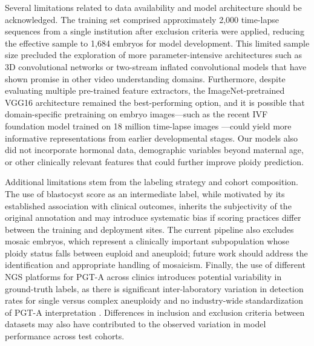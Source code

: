 \documentclass[11pt]{article}
\begin{document}
Several limitations related to data availability and model architecture should be acknowledged. The training set comprised approximately 2{,}000 time-lapse sequences from a single institution after exclusion criteria were applied, reducing the effective sample to 1{,}684 embryos for model development. This limited sample size precluded the exploration of more parameter-intensive architectures such as 3D convolutional networks or two-stream inflated convolutional models that have shown promise in other video understanding domains. Furthermore, despite evaluating multiple pre-trained feature extractors, the ImageNet-pretrained VGG16 architecture remained the best-performing option, and it is possible that domain-specific pretraining on embryo images---such as the recent IVF foundation model trained on 18 million time-lapse images \citep{rajendran2025femi}---could yield more informative representations from earlier developmental stages. Our models also did not incorporate hormonal data, demographic variables beyond maternal age, or other clinically relevant features that could further improve ploidy prediction.

Additional limitations stem from the labeling strategy and cohort composition. The use of blastocyst score as an intermediate label, while motivated by its established association with clinical outcomes, inherits the subjectivity of the original annotation and may introduce systematic bias if scoring practices differ between the training and deployment sites. The current pipeline also excludes mosaic embryos, which represent a clinically important subpopulation whose ploidy status falls between euploid and aneuploid; future work should address the identification and appropriate handling of mosaicism. Finally, the use of different NGS platforms for PGT-A across clinics introduces potential variability in ground-truth labels, as there is significant inter-laboratory variation in detection rates for single versus complex aneuploidy and no industry-wide standardization of PGT-A interpretation \citep{zou2022timelapse}. Differences in inclusion and exclusion criteria between datasets may also have contributed to the observed variation in model performance across test cohorts.
\end{document}
